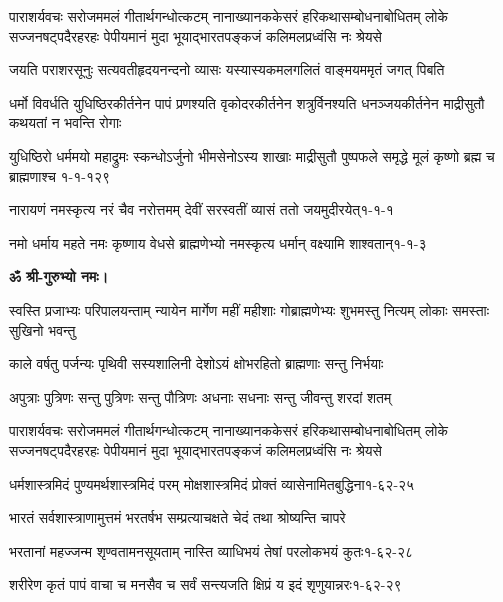 \fourlineindentedshloka
{पाराशर्यवचः सरोजममलं गीतार्थगन्धोत्कटम्}
{नानाख्यानककेसरं हरिकथासम्बोधनाबोधितम्}
{लोके सज्जनषट्पदैरहरहः पेपीयमानं मुदा}
{भूयाद्भारतपङ्कजं कलिमलप्रध्वंसि नः श्रेयसे}

\twolineshloka
{जयति पराशरसूनुः सत्यवतीहृदयनन्दनो व्यासः}
{यस्यास्यकमलगलितं वाङ्मयममृतं जगत् पिबति}


\fourlineindentedshloka
{धर्मो विवर्धति युधिष्ठिरकीर्तनेन} 
{पापं प्रणश्यति वृकोदरकीर्तनेन}
{शत्रुर्विनश्यति धनञ्जयकीर्तनेन} 
{माद्रीसुतौ कथयतां न भवन्ति रोगाः}

\annofourlineindentedshloka
{युधिष्ठिरो धर्ममयो महाद्रुमः}
{स्कन्धोऽर्जुनो भीमसेनोऽस्य शाखाः}
{माद्रीसुतौ पुष्पफले समृद्धे} 
{मूलं कृष्णो ब्रह्म च ब्राह्मणाश्च}
{१-१-१२९}

\annotwolineshloka
{नारायणं नमस्कृत्य नरं चैव नरोत्तमम्}
{देवीं सरस्वतीं व्यासं ततो जयमुदीरयेत्}{१-१-१}

\annotwolineshloka
{नमो धर्माय महते नमः कृष्णाय वेधसे}
{ब्राह्मणेभ्यो नमस्कृत्य धर्मान् वक्ष्यामि शाश्वतान्}{१-१-३}


\resetShloka
\centerline{\textbf{ॐ श्री-गुरुभ्यो नमः।}}

\resetShloka
{}

\fourlineindentedshloka
{स्वस्ति प्रजाभ्यः परिपालयन्ताम्}
{न्यायेन मार्गेण महीं महीशाः}
{गोब्राह्मणेभ्यः शुभमस्तु नित्यम्}
{लोकाः समस्ताः सुखिनो भवन्तु}

\twolineshloka
{काले वर्षतु पर्जन्यः पृथिवी सस्यशालिनी}
{देशोऽयं क्षोभरहितो ब्राह्मणाः सन्तु निर्भयाः}

\twolineshloka
{अपुत्राः पुत्रिणः सन्तु पुत्रिणः सन्तु पौत्रिणः}
{अधनाः सधनाः सन्तु जीवन्तु शरदां शतम्}

\fourlineindentedshloka
{पाराशर्यवचः सरोजममलं गीतार्थगन्धोत्कटम्}
{नानाख्यानककेसरं हरिकथासम्बोधनाबोधितम्}
{लोके सज्जनषट्पदैरहरहः पेपीयमानं मुदा}
{भूयाद्भारतपङ्कजं कलिमलप्रध्वंसि नः श्रेयसे}



\annotwolineshloka
{धर्मशास्त्रमिदं पुण्यमर्थशास्त्रमिदं परम्}
{मोक्षशास्त्रमिदं प्रोक्तं व्यासेनामितबुद्धिना}{१-६२-२५}

\twolineshloka
{भारतं सर्वशास्त्राणामुत्तमं भरतर्षभ}
{सम्प्रत्याचक्षते चेदं तथा श्रोष्यन्ति चापरे}

\annotwolineshloka
{भरतानां महज्जन्म शृण्वतामनसूयताम्}
{नास्ति व्याधिभयं तेषां परलोकभयं कुतः}{१-६२-२८}

\annotwolineshloka
{शरीरेण कृतं पापं वाचा च मनसैव च}
{सर्वं सन्त्यजति क्षिप्रं य इदं शृणुयान्नरः}{१-६२-२९}

